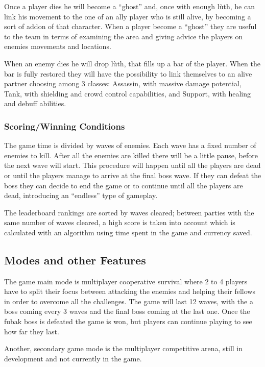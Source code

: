 \documentclass[12pt]{article}
\begin{document}
Once a player dies he will become a “ghost” and, once with enough lùth, he can link his movement to the one of an ally player who is still alive, by becoming a sort of addon of that character. When a player become a “ghost” they are useful to the team in terms of examining the area and giving advice the players on enemies movements and locations.

When an enemy dies he will drop lùth, that fills up a bar of the player. When the bar is fully restored they will have the possibility to link themselves to an alive partner choosing among 3 classes: Assassin, with massive damage potential, Tank, with shielding and crowd control capabilities, and Support, with healing and debuff abilities.

\subsubsection{Scoring/Winning Conditions}

The game time is divided by waves of enemies. Each wave has a fixed number of enemies to kill. After all the enemies are killed there will be a little pause, before the next wave will start. This procedure will happen until all the players are dead or until the players manage to arrive at the final boss wave. If they can defeat the boss they can decide to end the game or to continue until all the players are dead, introducing an “endless” type of gameplay.

The leaderboard rankings are sorted by waves cleared; between parties with the same number of waves cleared, a high score is taken into account which is calculated with an algorithm using time spent in the game and currency saved. 

\subsection{Modes and other Features}

The game main mode is multiplayer cooperative survival where 2 to 4 players have to split their focus between attacking the enemies and helping their fellows in order to overcome all the challenges. The game will last 12 waves, with the a boss coming every 3 waves and the final boss coming at the last one. Once the fubak boss is defeated the game is won, but players can continue playing to see how far they last.

Another, secondary game mode is the multiplayer competitive arena, still in development and not currently in the game.
\end{document}
